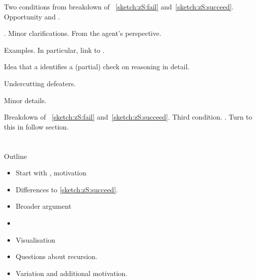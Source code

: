 \begin{note}
  Two conditions from breakdown of ~\ref{sketch:zS:fail} and~\ref{sketch:zS:succeed}.
  Opportunity and \check{}.

  \requ{}.
  Minor clarifications.
  From the agent's perspective.

  Examples.
  In particular, link to .

  Idea that a \requ{} identifies a (partial) check on reasoning in detail.

  Undercutting defeaters.

  Minor details.
\end{note}

\begin{note}
  Breakdown of ~\ref{sketch:zS:fail} and~\ref{sketch:zS:succeed}.
  Third condition.
  .
  Turn to this in follow section.
\end{note}

\section{\zS{}}
\label{cha:zS:sec:question}

\begin{note}[Outline]
  Outline
  \begin{itemize}
  \item
    Start with \qzS{}, motivation
  \item
    Differences to \autoref{sketch:zS:succeed}.
  \item
    Broader argument
  \item
  \item
    Visualisation
  \item
    Questions about recursion.
  \item
    Variation and additional motivation.
  \end{itemize}
\end{note}

